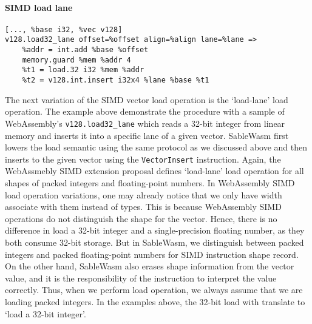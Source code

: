 \paragraph{SIMD load lane} \quad
\begin{lstlisting}[basicstyle=\linespread{1}\small, language=SableWasmMIR]
[..., %base i32, %vec v128]
v128.load32_lane offset=%offset align=%align lane=%lane =>
    %addr = int.add %base %offset
    memory.guard %mem %addr 4
    %t1 = load.32 i32 %mem %addr
    %t2 = v128.int.insert i32x4 %lane %base %t1
\end{lstlisting}
The next variation of the SIMD vector load operation is the `load-lane' load operation. The example above demonstrate the procedure with a sample of WebAssembly's \texttt{v128.load32\_lane}  which reads a 32-bit integer from linear memory and inserts it into a specific lane of a given vector. SableWasm first lowers the load semantic using the same protocol as we discussed above and then inserts to the given vector using the \texttt{VectorInsert} instruction. Again, the WebAssmebly SIMD extension proposal defines `load-lane' load operation for all shapes of packed integers and floating-point numbers. In WebAssembly SIMD load operation variations, one may already notice that we only have width associate with them instead of types. This is because WebAssembly SIMD operations do not distinguish the shape for the vector. Hence, there is no difference in load a 32-bit integer and a single-precision floating number, as they both consume 32-bit storage. But in SableWasm, we distinguish between packed integers and packed floating-point numbers for SIMD instruction shape record.  On the other hand, SableWasm also erases shape information from the vector value, and it is the responsibility of the instruction to interpret the value correctly. Thus, when we perform load operation, we always assume that we are loading packed integers. In the examples above, the 32-bit load with translate to `load a 32-bit integer'.

